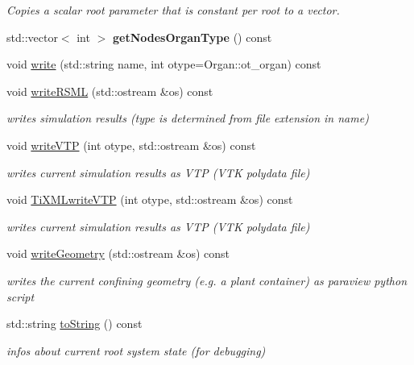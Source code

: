 \begin{DoxyCompactItemize}
\begin{DoxyCompactList}\small\item\em Copies a scalar root parameter that is constant per root to a vector. \end{DoxyCompactList}\item 
\mbox{\label{classCPlantBox_1_1Plant_a38297a075d5b59f3f4ca1fb17d4614a9}} 
std\+::vector$<$ int $>$ {\bfseries get\+Nodes\+Organ\+Type} () const
\item 
void \hyperlink{classCPlantBox_1_1Plant_af55cdb6c0bfd640c614e0ca80274f58e}{write} (std\+::string name, int otype=Organ\+::ot\+\_\+organ) const
\item 
void \hyperlink{classCPlantBox_1_1Plant_ae1fde3d22aa8a6b8e91684b68668a422}{write\+R\+S\+ML} (std\+::ostream \&os) const
\begin{DoxyCompactList}\small\item\em writes simulation results (type is determined from file extension in name) \end{DoxyCompactList}\item 
void \hyperlink{classCPlantBox_1_1Plant_a9c6a8fae2215911ab0b7cebd8355128e}{write\+V\+TP} (int otype, std\+::ostream \&os) const
\begin{DoxyCompactList}\small\item\em writes current simulation results as V\+TP (V\+TK polydata file) \end{DoxyCompactList}\item 
void \hyperlink{classCPlantBox_1_1Plant_a5843463140b144b5e5a08d705c521efb}{Ti\+X\+M\+Lwrite\+V\+TP} (int otype, std\+::ostream \&os) const
\begin{DoxyCompactList}\small\item\em writes current simulation results as V\+TP (V\+TK polydata file) \end{DoxyCompactList}\item 
void \hyperlink{classCPlantBox_1_1Plant_ae9037860524689c4475b7eb7f9ffc56e}{write\+Geometry} (std\+::ostream \&os) const
\begin{DoxyCompactList}\small\item\em writes the current confining geometry (e.\+g. a plant container) as paraview python script \end{DoxyCompactList}\item 
std\+::string \hyperlink{classCPlantBox_1_1Plant_ae4ec37df107dc7f669bfb1c067e11204}{to\+String} () const
\begin{DoxyCompactList}\small\item\em infos about current root system state (for debugging) \end{DoxyCompactList}\item 

\end{DoxyCompactItemize}
